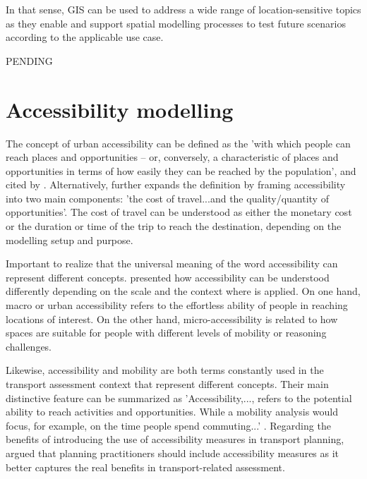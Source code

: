 \documentclass[12pt, a4paper]{report}
\begin{document}
In that sense, GIS can be used to address a wide range of location-sensitive topics as they enable and support spatial modelling processes to test future scenarios according to the applicable use case.

PENDING






\section{Accessibility modelling}

The concept of urban accessibility can be defined as the 'with which people can reach places and opportunities – or, conversely, a characteristic of places and opportunities in terms of how easily they can be reached by the population', \cite{geursAccessibilityEvaluationLanduse2004b} and \cite{neutensEquityUrbanService2010} cited by \cite{pereiraIntroductionUrbanAccessibility2023a}. Alternatively, \cite{paezMeasuringAccessibilityPositive2012} further expands the definition by framing accessibility into two main components: 'the cost of travel...and the quality/quantity of opportunities'. The cost of travel can be understood as either the monetary cost or the duration or time of the trip to reach the destination, depending on the modelling setup and purpose.

Important to realize that the universal meaning of the word accessibility can represent different concepts. \cite{pereiraIntroductionUrbanAccessibility2023a} presented how accessibility can be understood differently depending on the scale and the context where is applied. On one hand, macro or urban accessibility refers to the effortless ability of people in reaching locations of interest. On the other hand, micro-accessibility is related to how spaces are suitable for people with different levels of mobility or reasoning challenges. 



Likewise, accessibility and mobility are both terms constantly used in the transport assessment context that represent different concepts. Their main distinctive feature can be summarized 
as 'Accessibility,..., refers to the potential ability to reach activities and opportunities. While a mobility analysis would focus, for example, on the time people spend commuting...' \cite{pereiraIntroductionUrbanAccessibility2023a}. Regarding the benefits of introducing the use of accessibility measures in transport planning, \cite{ferreiraAccessibilityGoldMobility2012} argued that planning practitioners should include accessibility measures as it better captures the real benefits in transport-related assessment.
\end{document}
